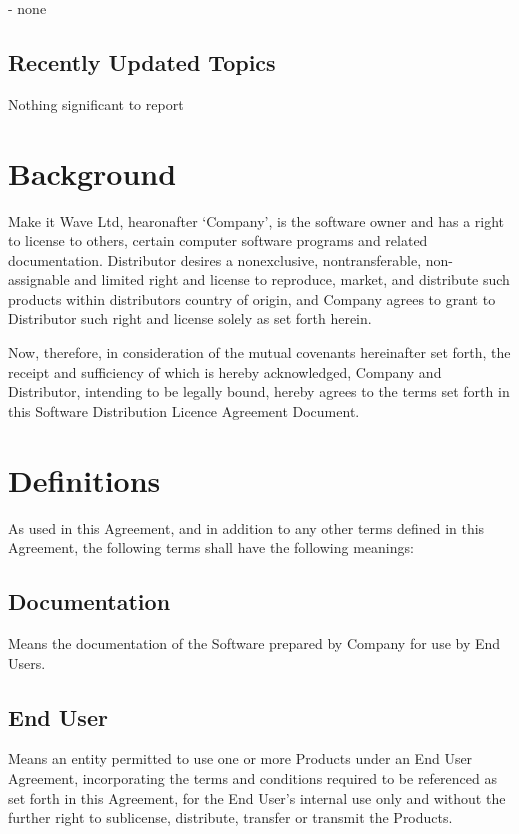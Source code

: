 \documentclass[letterpaper,10pt,english]{sphinxmanual}
\begin{document}
 - none


\section{Recently Updated Topics}
\label{\detokenize{releasenotes:recently-updated-topics}}
Nothing significant to report


\chapter{Background}
\label{\detokenize{background:background}}\label{\detokenize{background::doc}}
Make it Wave Ltd, hearonafter ‘Company’, is the software owner and has a right to license to others, certain computer software programs and related documentation. Distributor desires a nonexclusive, nontransferable, non-assignable and limited right and license to reproduce, market, and distribute such products within distributors country of origin,  and Company agrees to grant to Distributor such right and license solely as set forth herein.

Now, therefore, in consideration of the mutual covenants hereinafter set forth, the receipt and sufficiency of which is hereby acknowledged, Company and Distributor, intending to be legally bound, hereby agrees to the terms set forth in this Software Distribution Licence Agreement Document.


\chapter{Definitions}
\label{\detokenize{definitions:definitions}}\label{\detokenize{definitions::doc}}
As used in this Agreement, and in addition to any other terms defined in this Agreement, the following terms shall have the following meanings:


\section{Documentation}
\label{\detokenize{definitions:documentation}}
Means the documentation of the Software prepared by Company for use by End Users.


\section{End User}
\label{\detokenize{definitions:end-user}}
Means an entity permitted to use one or more Products under an End User Agreement, incorporating the terms and conditions required to be referenced as set forth in this Agreement, for the End User’s internal use only and without the further right to sublicense, distribute, transfer or transmit the Products.
\end{document}
